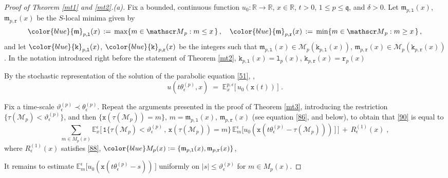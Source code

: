 \documentclass[reqno]{amsart}
\theoremstyle{plain}
\theoremstyle{definition}
\newcommand{\mf}[1]{{\mathfrak #1}}
\newcommand{\bb}[1]{{\mathbb #1}}
\newcommand{\ms}[1]{{\mathscr #1}}
\newcommand{\mtt}[1]{{\mathtt #1}}
\newcounter{as}[section]
\newcommand{\<}{\langle}
\renewcommand{\>}{\rangle}
\begin{document}
\begin{proof}[Proof of Theorem \ref{mt1} and \ref{mt2}.{\rm (a)}]
Fix a bounded, continuous function $u_0\colon \bb R \to \bb R$,
$x\in\bb R$, $t>0$, $1\le p\le \mf q$, and $\delta>0$. Let
$\mf m_{p,\mtt l}(x)$, $\mf m_{p,\mtt r}(x)$ be the $S$-local minima
given by
\begin{equation}
\label{100}
{\color{blue} \mf m_{p,\mtt l}(x)} \,:=\, 
\max\{ m\in \ms M_p : m\le x\,\}\,,\quad
{\color{blue} \mf m_{p,\mtt r}(x)} \,:=\,
\min\{ m\in \ms M_p : m\ge x\,\}\,,
\end{equation}
and let $\color{blue} \mtt k_{p,\mtt l}(x)$,
$\color{blue} \mtt k_{p,\mtt r}(x)$ be the integers such that
$\mf m_{p,\mtt l}(x) \in \ms M_p(\mtt k_{p,\mtt l}(x))$,
$\mf m_{p,\mtt r}(x) \in \ms M_p(\mtt k_{p,\mtt r}(x))$.  In the
notation introduced right before the statement of Theorem \ref{mt2},
$\mtt k_{p,\mtt l}(x) = \mtt l_p(x)$,
$\mtt k_{p,\mtt r}(x) = \mtt r_p(x)$

By the stochastic representation of the solution of the parabolic
equation \eqref{51}, \cite[Theorem 6.5.3]{Fri},
\begin{equation}
\label{90}
u(t \theta_{\epsilon}^{(p)},x) \;=\;
\bb E^{p,\epsilon}_x\big[ \,
u_0( \mtt x(t))\,\big] \;.
\end{equation}

\smallskip\noindent{\bf Step 1: Reduction to $x\in \ms M_p$.}  Fix a
time-scale $\vartheta^{(p)}_\epsilon \prec \theta^{(p)}_\epsilon$.
Repeat the arguments presented in the proof of Theorem \ref{mt3},
introducing the restriction
$\{\tau(\ms M_p) < \vartheta^{(p)}_\epsilon\}$, and then
$\{\mtt x(\tau(\ms M_{p})) = m \}$, $m = \mf m_{p,\mtt l}(x)$,
$\mf m_{p,\mtt r}(x)$ (see equation \eqref{86}, and below), to obtain that
\eqref{90} is equal to
\begin{equation}
\label{91}
\sum_{m\in M_p(x)} \bb E^{\epsilon}_{x} \Big[ \, \mtt 1\big\{ \tau(\ms M_p) <
\vartheta^{(p)}_\epsilon\,,\,
\mtt x(\tau(\ms M_{p})) = m \big\}\,
\bb E^{\epsilon}_{m} \big[ u_0( \mtt x(t\theta^{(p)}_\epsilon -
\tau(\ms M_p))) \,\big] \,\Big] \,+\, R^{(1)}_\epsilon (x)\;,
\end{equation}
where $R^{(1)}_\epsilon (x)$ satisfies \eqref{88},
${\color{blue} M_p(x)} := \{\mf m_{p,\mtt l}(x) , \mf m_{p,\mtt
r}(x)\}$, 

\smallskip{}  It remains to
estimate
$\bb E^{\epsilon}_{m} \big[ u_0( \mtt x(t\theta^{(p)}_\epsilon - s))
\,\big]$ uniformly on $|s|\le \vartheta^{(p)}_\epsilon$ for
$m\in M_p(x)$.


\end{proof}
\end{document}
